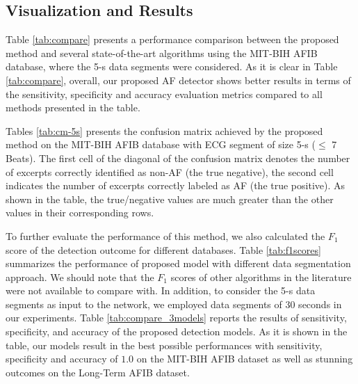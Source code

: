 \documentclass[conference]{IEEEtran}
\begin{document}
\begin{table} [ht]  

\caption{Confusion matrix achieved by the proposed method on the MIT-BIH AFIB database with ECG segment of size 5-s (
$\leq$ 7 Beats).}
\renewcommand{\arraystretch}{1.2}
\end{table}

\subsection{Visualization and Results}
\label{sec:visual_results}
 Table \ref{tab:compare} presents a performance comparison between the proposed method and several state-of-the-art algorithms using the MIT-BIH AFIB database, where the 5-s data segments were considered. As it is clear in Table \ref{tab:compare}, overall, our proposed AF detector shows better results in terms of the sensitivity, specificity and accuracy evaluation metrics compared to all methods presented in the table.
 
 Tables \ref{tab:cm-5s} presents the confusion matrix achieved by the proposed method on the MIT-BIH AFIB database with ECG segment of size 5-s ($\leq$ 7 Beats). The first cell of the diagonal of the confusion matrix denotes the number of excerpts correctly identified as non-AF (the true negative), the second cell indicates the number of excerpts correctly labeled as AF (the true positive). As shown in the table, the true/negative values are much greater than the other values in their corresponding rows.
 
 
 To further evaluate the performance of this method, we also calculated the $F_1$ score of the detection outcome for different databases. Table \ref{tab:f1scores} summarizes the performance of proposed model with different data segmentation approach. We should note that the $F_1$ scores of other algorithms in the literature were not available to compare with. In addition, to consider the 5-s data segments as input to the network, we employed data segments of 30 seconds in our experiments. Table \ref{tab:compare_3models} reports the results of sensitivity, specificity, and accuracy of the proposed detection models. As it is shown in the table, our models result in the best possible performances with sensitivity, specificity and accuracy of $1.0$ on the MIT-BIH AFIB dataset as well as stunning outcomes on the Long-Term AFIB dataset.     
\end{document}
